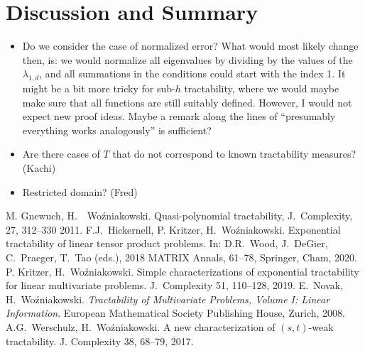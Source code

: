 \documentclass[11pt,a4paper]{article}
\newcommand{\fred}[1]{\begingroup\color{blue}#1\endgroup}
\newcommand{\peter}[1]{\begingroup\color{purple}#1\endgroup}
\begin{document}
\section{Discussion and Summary}

\fred{
\begin{itemize}
\item Do we consider the case of normalized error? \peter{What would most likely change then, is: we would normalize all eigenvalues by dividing by the values of the $\lambda_{1,d}$, and all summations in the conditions could start with the index 1. It might be a bit more tricky for sub-$h$ tractability, where we would maybe make sure that all functions are still suitably defined. However, I would not expect new proof ideas. Maybe a remark along the lines of ``presumably everything works analogously'' is sufficient?}
\item Are there cases of $T$ that do not correspond to known tractability measures? (Kachi)
\item Restricted domain? (Fred)
\end{itemize}}


\begin{thebibliography}{99}
 M. Gnewuch, H.~~Wo\'zniakowski. Quasi-polynomial tractability, J.~Complexity, 27, 312--330 2011.
 F.J.~Hickernell, P. Kritzer, H.~Wo\'zniakowski.  Exponential tractability of linear tensor product problems. In:
D.R.~Wood, J.~DeGier, C.~Praeger, T.~Tao (eds.), 2018 MATRIX Annals, 61--78, Springer, Cham, 2020.
 P. Kritzer, H.~Wo\'zniakowski.
Simple characterizations of exponential tractability for linear
multivariate problems. J.~Complexity 51, 110--128, 2019.
 E.~Novak, H.~Wo\'zniakowski. \textit{Tractability of Multivariate Problems, Volume I: Linear Information}.
European Mathematical Society Publishing House, Zurich, 2008.
  A.G.~Werschulz, H.~Wo\'zniakowski. A new characterization of $(s,t)$-weak tractability. J. Complexity 38, 68--79, 2017.


\end{thebibliography}
\end{document}
